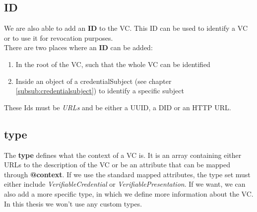 \documentclass[
	a4paper               %
	,BCOR=0mm            %
	,bibliography=totoc   %
	,listof=totoc         %
	,monolingual
	,twoside=false
]{bfhthesis}              %
\begin{document}
\subsection{ID}
We are also able to add an \textbf{ID} to the VC. This ID can be used to identify a VC or to use it for revocation purposes.\\
There are two places where an \textbf{ID} can be added:
\begin{enumerate}
	\item In the root of the VC, such that the whole VC can be identified
	\item Inside an object of a credentialSubject (see chapter \ref{subsub:credentialsubject}) to identify a specific subject
\end{enumerate}

These Ids must be \textit{URLs} and be either a UUID, a DID or an HTTP URL.

\subsection{type}

The \textbf{type} defines what the context of a VC is. 
It is an array containing either URLs to the description of the VC or be an attribute that can be mapped through \textbf{@context}.
If we use the standard mapped attributes, the type set must either include \textit{VerifiableCredential} or \textit{VerifiablePresentation}.
If we want, we can also add a more specific type, in which we define more information about the VC.\\
In this thesis we won't use any custom types.
\end{document}
